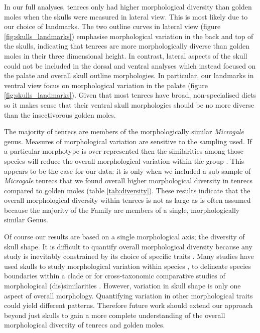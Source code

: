 \documentclass[12pt,a4paper]{article}
\begin{document}
	
	In our full analyses, tenrecs only had higher morphological diversity than golden moles when the skulls were measured in lateral view. This is most likely due to our choice of landmarks. The two outline curves in lateral view (figure \ref{fig:skulls_landmarks}) emphasise morphological variation in the back and top of the skulls, indicating that tenrecs are more morphologically diverse than golden moles in their three dimensional height. 
	In contrast, lateral aspects of the skull could not be included in the dorsal and ventral analyses which instead focused on the palate and overall skull outline morphologies. In particular, our landmarks in ventral view focus on morphological variation in the palate (figure \ref{fig:skulls_landmarks}). Given that most tenrecs have broad, non-specialised diets \citep{Olson2013} so it makes sense that their ventral skull morphologies should be no more diverse than the insectivorous golden moles.
	
	The majority of tenrecs are members of the morphologically similar \textit{Microgale} genus. Measures of morphological variation are sensitive to the sampling used. If a particular morphotype is over-represented then the similarities among those species will reduce the overall morphological variation within the group \citep{Foote1991}. This appears to be the case for our data: it is only when we included a sub-sample of \textit{Microgale} tenrecs that we found overall higher morphological diversity in tenrecs compared to golden moles (table \ref{tab:diversity}). These results indicate that the overall morphological diversity within tenrecs is not as large as is often assumed \citep[e.g.][]{Eisenberg1969, Olson2013} because the majority of the Family are members of a single, morphologically similar Genus.


	Of course our results are based on a single morphological axis; the diversity of skull shape. It is difficult to quantify overall morphological diversity because any study is inevitably constrained by its choice of specific traits \citep{Roy1997}. Many studies have used skulls to study morphological variation within species \citep{Blagojevic2011, Bornholdt2008}, to delineate species boundaries within a clade \citep[e.g.][]{Panchetti2008} or for cross-taxonomic comparative studies of morphological (dis)similarities \citep[e.g.][]{Ruta2013, Goswami2011, Wroe2007}. 
	However, variation in skull shape is only one aspect of overall morphology. Quantifying variation in other morphological traits could yield different patterns. Therefore future work should extend our approach beyond just skulls to gain a more complete understanding of the overall morphological diversity of tenrecs and golden moles. 
		
\end{document}
